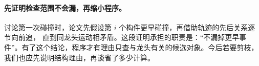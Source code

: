 \paragraph{先证明检查范围不会漏，再缩小程序。}
讨论第一次碰撞时，论文先假设第 $i$ 个构件更早碰撞，再借助轨迹的先后关系逐节向前追，
直到同龙头运动相矛盾。这段证明承担的职责是：“不漏掉更早事件”。有了这个结论，程序才有理由只查与龙头有关的候选对象。今后若要剪枝，
我们也应先说明结构理由，再谈省了多少计算。

